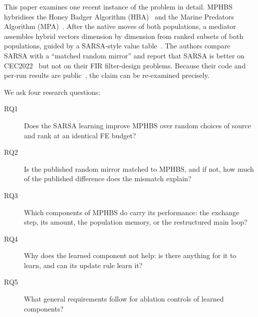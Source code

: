 \documentclass[11pt]{article}
\theoremstyle{definition}
\theoremstyle{remark}
\begin{document}
This paper examines one recent instance of the problem in detail. MPHBS~\citep{flores2026mphbs} hybridises the Honey
Badger Algorithm (HBA)~\citep{hashim2022hba} and the Marine Predators Algorithm (MPA)~\citep{faramarzi2020mpa}. After the
native moves of both populations, a mediator assembles hybrid vectors dimension by dimension from ranked subsets of both
populations, guided by a SARSA-style value table~\citep{sutton2018rl}. The authors compare SARSA with a ``matched random
mirror'' and report that SARSA is better on CEC2022~\citep{kumar2021cec2022} but not on their FIR filter-design problems.
Because their code and per-run results are public~\citep{flores2026code}, the claim can be re-examined precisely.

We ask four research questions:
\begin{description}
\item[RQ1] Does the SARSA learning improve MPHBS over random choices of source and rank at an identical FE budget?
\item[RQ2] Is the published random mirror matched to MPHBS, and if not, how much of the published difference does the
  mismatch explain?
\item[RQ3] Which components of MPHBS do carry its performance: the exchange step, its amount, the population memory, or
  the restructured main loop?
\item[RQ4] Why does the learned component not help: is there anything for it to learn, and can its update rule learn it?
\item[RQ5] What general requirements follow for ablation controls of learned components?
\end{description}
\end{document}
